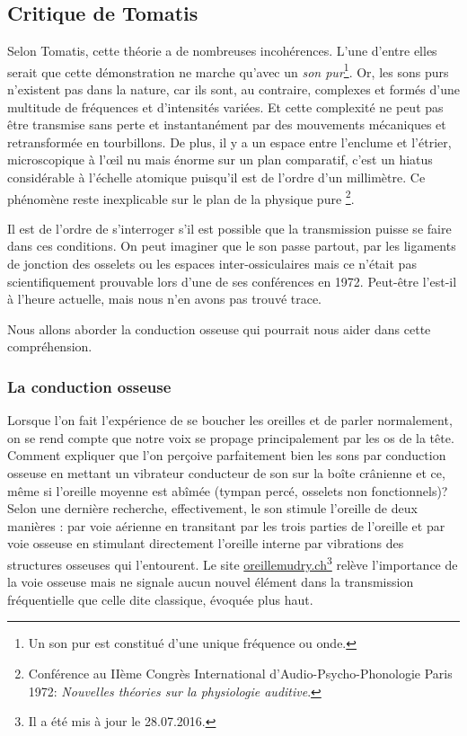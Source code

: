 \subsection{Critique de Tomatis}
 
Selon Tomatis, cette théorie a de nombreuses incohérences. L'une
d'entre elles serait que cette démonstration ne marche qu'avec un
\emph{son pur}\footnote{Un son pur est constitué d'une unique fréquence ou onde.}.
Or, les sons purs n'existent pas dans la nature, car ils sont, au
contraire, complexes et formés d'une multitude de fréquences et d'intensités
variées. Et cette complexité ne peut pas être transmise sans perte
et instantanément par des mouvements mécaniques et retransformée en
tourbillons. De plus, il y a un espace entre l'enclume et l'étrier,
microscopique à l'\oe il nu mais énorme sur un plan comparatif, c'est
un hiatus considérable à l'échelle atomique puisqu'il est de l'ordre
d'un millimètre. Ce phénomène reste inexplicable sur le plan de la
physique pure%
\footnote{Conférence au IIème Congrès International d'Audio-Psycho-Phonologie
Paris 1972:  \emph{Nouvelles théories sur la physiologie auditive}.}.
 
Il est de l'ordre de s'interroger s'il est possible que la transmission
puisse se faire dans ces conditions. On peut imaginer que le son passe
partout, par les ligaments de jonction des osselets ou les espaces
inter-ossiculaires mais %
ce n'était pas scientifiquement prouvable lors d'une de ses conférences
en 1972. Peut-être l'est-il à l'heure actuelle, mais nous n'en avons
pas trouvé trace. 

Nous allons aborder la conduction osseuse qui pourrait nous aider
dans cette compréhension.

\subsubsection{La conduction osseuse}

Lorsque l'on fait l'expérience de se
boucher les oreilles et de parler normalement, on se rend compte que
notre voix se propage principalement par les os de la tête. Comment
expliquer que l'on perçoive parfaitement bien les sons par conduction
osseuse en mettant un vibrateur conducteur de son sur la boîte crânienne et ce, même si l'oreille moyenne est abîmée (tympan percé, osselets non fonctionnels)? Selon une dernière recherche,
 effectivement, le
son stimule l'oreille de deux manières : par voie aérienne en transitant
par les trois parties de l'oreille et par voie osseuse en stimulant
directement l'oreille interne par vibrations des structures osseuses
qui l'entourent. Le site \href{oreillemudry.ch}{oreillemudry.ch}\footnote{Il a été mis à jour le 28.07.2016.} relève l'importance de la voie osseuse
mais ne signale aucun nouvel élément dans la transmission
fréquentielle que celle dite classique, évoquée plus haut.
 
